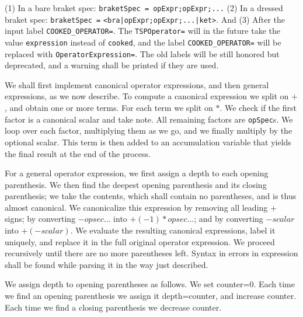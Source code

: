 \documentclass{article}
\begin{document}
(1) In a bare braket spec:
 \texttt{braketSpec = opExpr;opExpr;...}
(2) In a dressed braket spec:
 \texttt{braketSpec =} \texttt{<bra|opExpr;opExpr;...|ket>}.
And (3) After the input label \texttt{COOKED\_OPERATOR=}.
 The \texttt{TSPOperator=} will in the future take the
 value \verb!expression! instead of \verb!cooked!, and
 the label  \texttt{COOKED\_OPERATOR=} will be replaced
 with \texttt{OperatorExpression=}. The old labels will
be still honored but deprecated, and a warning shall be printed
if they are used.

We shall first implement canonical operator expressions, and then general expressions,
as we now describe.
To compute a canonical expression we split on $+$, and obtain one or more terms.
For each term we split on $*$. We check if the first factor is a 
canonical scalar and take note. All remaining factors are \texttt{opSpec}s.
We loop over each factor, multiplying them as we go, and
we finally multiply by the optional scalar. This term is then added to an
accumulation variable that yields the final result at the end of the process.

For a general operator expression, we first assign a depth to each
opening parenthesis. We then find the deepest opening parenthesis and its closing parenthesis;
we take the contents, which shall contain no parentheses, and is thus
almost canonical. We canonicalize this expression by removing all leading $+$ signs;
by converting $-opsec...$ into $+(-1)*opsec...$; and 
by converting $-scalar$ into $+(-scalar)$. We evaluate the resulting
canonical expressions, label it uniquely, and replace it in
the full original operator expression. We proceed recursively until
there are no more parentheses left.
Syntax in errors in expression shall be found while parsing it in the way
just described.

We assign depth to opening parentheses as follows. We set counter=0. Each
time we find an opening parenthesis we assign it depth=counter, and increase counter.
Each time we find a closing parenthesis we decrease counter.
\end{document}
